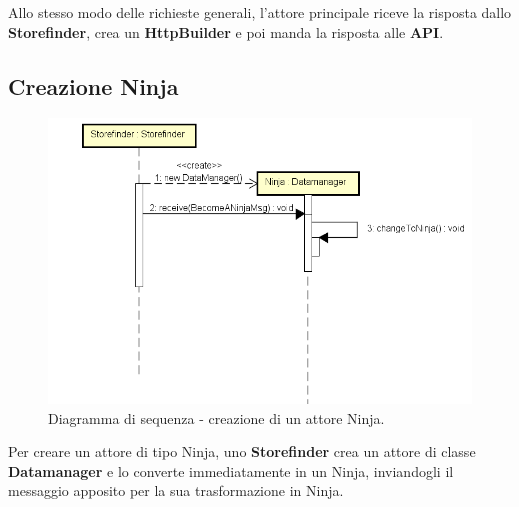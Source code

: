 \documentclass[a4paper]{article}
\begin{document}
            Allo stesso modo delle richieste generali, l'attore principale riceve la risposta dallo \textbf{Storefinder}, crea un \textbf{HttpBuilder} e poi manda la risposta alle \textbf{API}.
            
        \subsection{Creazione Ninja}
            \begin{figure} [H]
				\centering
				\includegraphics[scale=0.4]{ST/seq/CreazioneNinja.png}
				\caption{Diagramma di sequenza - creazione di un attore Ninja.}
			\end{figure}
            Per creare un attore di tipo Ninja, uno \textbf{Storefinder} crea un attore di classe \textbf{Datamanager} e lo converte immediatamente in un Ninja, inviandogli il messaggio apposito 
            per la sua trasformazione in Ninja.
         
\end{document}
